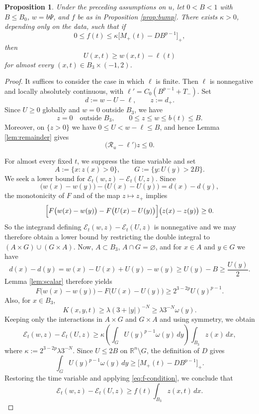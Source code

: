 \documentclass[10pt]{amsart}
\theoremstyle{plain}
\newtheorem{proposition}[lemma]{Proposition}
\theoremstyle{definition}
\theoremstyle{remark}
\numberwithin{equation}{section}
\newcommand{\R}{\mathbb R}
\begin{document}
\begin{proposition}\label{prop:forced-comparison}
Under the preceding assumptions on $u$, let $0<B<1$ with $B\le B_0$,
$w=b\Psi$, and $f$ be as in Proposition \ref{prop:bump}.
There exists $\kappa>0$, depending only on the data, such that if
\begin{equation}\label{eq:f-condition}
0\le f(t)\le\kappa\bigl[M_+(t)-DB^{p-1}\bigr]_+,
\end{equation}
then
\begin{equation}\label{eq:comparison-final}
U(x,t)\ge w(x,t)-\ell(t)
\end{equation}
for almost every $(x,t)\in B_3\times(-1,2)$.
\end{proposition}

\begin{proof}
It suffices to consider the case in which $\ell$ is finite.
Then $\ell$ is nonnegative and locally absolutely continuous, with
$\ell'=C_0(B^{p-1}+T_-)$. Set
\[
d:=w-U-\ell,\qquad z:=d_+.
\]
Since $U\ge0$ globally and $w=0$ outside $B_3$, we have
\begin{equation}\label{eq:comparison-z-bounds}
z=0\quad\text{outside }B_3,
\qquad 0\le z\le w\le b(t)\le B.
\end{equation}
Moreover, on $\{z>0\}$ we have $0\le U<w-\ell\le B$, and hence
Lemma \ref{lem:remainder} gives
\begin{equation}\label{eq:comparison-remainder-cancel}
\bigl(\mathcal R_u-\ell'\bigr)z\le0.
\end{equation}

For almost every fixed $t$, we suppress the time variable and set
\[
A:=\{x:z(x)>0\},\qquad G:=\{y:U(y)>2B\}.
\]
We seek a lower bound for
$\mathcal E_t(w,z)-\mathcal E_t(U,z)$. Since
\[
\bigl(w(x)-w(y)\bigr)-\bigl(U(x)-U(y)\bigr)=d(x)-d(y),
\]
the monotonicity of $F$ and of the map $z \mapsto z_+$ implies
\[
\Bigl[F\bigl(w(x)-w(y)\bigr)-F\bigl(U(x)-U(y)\bigr)\Bigr]
\bigl(z(x)-z(y)\bigr)\ge0.
\]
So the integrand defining
$\mathcal E_t(w,z)-\mathcal E_t(U,z)$ is nonnegative and
we may therefore obtain a lower bound by restricting the double
integral to $(A\times G)\cup(G\times A)$.
Now, $A\subset B_3$, $A\cap G=\varnothing$, and
for $x\in A$ and $y\in G$ we have
\[
d(x)-d(y)
=w(x)-U(x)+U(y)-w(y)
\ge U(y)-B\ge\frac{U(y)}2.
\]
Lemma \ref{lem:scalar} therefore yields
\[
F\bigl(w(x)-w(y)\bigr)-F\bigl(U(x)-U(y)\bigr)
\ge 2^{3-2p}U(y)^{p-1}.
\]
Also, for $x\in B_3$,
\[
K(x,y,t)\ge\lambda(3+|y|)^{-N}
\ge\lambda3^{-N}\omega(y).
\]
Keeping only the interactions in $A\times G$ and $G\times A$
and using symmetry, we obtain
\[
\mathcal E_t(w,z)-\mathcal E_t(U,z)
\ge\kappa
\left(\int_G U(y)^{p-1}\omega(y)\,dy\right)
\int_{B_3}z(x)\,dx,
\]
where $\kappa:=2^{3-2p}\lambda3^{-N}$. Since $U\le2B$ on
$\R^n\setminus G$, the definition of $D$ gives
\[
\int_G U(y)^{p-1}\omega(y)\,dy
\ge\bigl[M_+(t)-DB^{p-1}\bigr]_+.
\]
Restoring the time variable and applying \eqref{eq:f-condition},
we conclude that
\begin{equation}\label{eq:comparison-energy-gain}
\mathcal E_t(w,z)-\mathcal E_t(U,z)
\ge f(t)\int_{B_3}z(x,t)\,dx.
\end{equation}


\end{proof}
\end{document}
